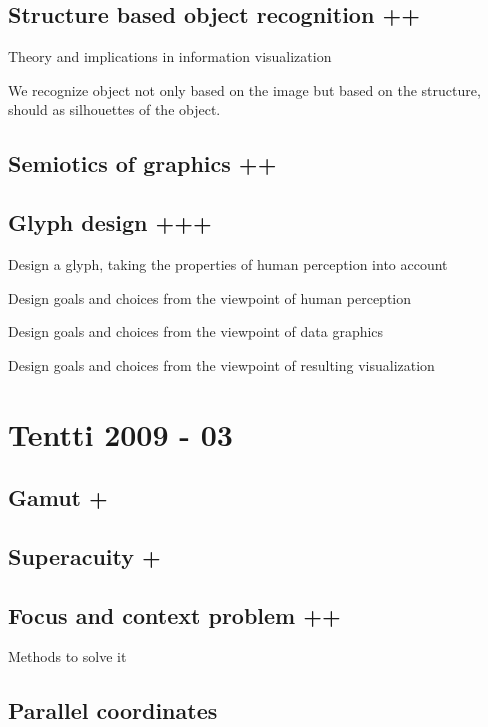 \documentclass[a4paper]{article}
\begin{document}
\subsection{Structure based object recognition ++}

Theory and implications in information visualization

We recognize object not only based on the image but based on the structure, should as silhouettes of the object. 

\subsection{Semiotics of graphics ++}

\subsection{Glyph design +++}

Design a glyph, taking the properties of human perception into account

Design goals and choices from the viewpoint of human perception

Design goals and choices from the viewpoint of data graphics

Design goals and choices from the viewpoint of resulting visualization



\section{Tentti 2009 - 03}

\subsection{Gamut +}

\subsection{Superacuity +}

\subsection{Focus and context problem ++}

Methods to solve it

\subsection{Parallel coordinates}
\end{document}
